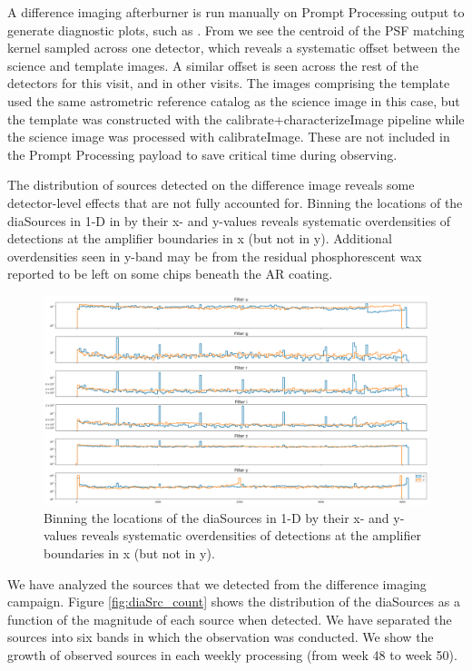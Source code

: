 A difference imaging afterburner is run manually on Prompt Processing output to generate diagnostic plots, such as .
From  we see the centroid of the PSF matching kernel sampled across one detector, which reveals a systematic offset between the science and template images.
A similar offset is seen across the rest of the detectors for this visit, and in other visits.
The images comprising the template used the same astrometric reference catalog as the science image in this case, but the template was constructed with the calibrate+characterizeImage pipeline while the science image was processed with calibrateImage.
These are not included in the Prompt Processing payload to save critical time during observing.

The distribution of sources detected on the difference image reveals some detector-level effects that are not fully accounted for.
Binning the locations of the diaSources in 1-D in  by their x- and y-values reveals systematic overdensities of detections at the amplifier boundaries in x (but not in y).
Additional overdensities seen in y-band may be from the residual phosphorescent wax reported to be left on some chips beneath the AR coating.

\begin{figure}
\includegraphics[width=\textwidth]{dia/figures/diaSource_distribution.png}
\caption{Binning the locations of the diaSources in 1-D by their x- and y-values reveals systematic overdensities of detections at the amplifier boundaries in x (but not in y). \label{fig:diaSource-distribution}}
\end{figure}

We have analyzed the sources that we detected from the difference imaging campaign. Figure \ref{fig:diaSrc_count} shows the distribution of the diaSources as a function of the magnitude of each source when detected. We have separated the sources into six bands in which the observation was conducted. We show the growth of observed sources in each weekly processing (from week 48 to week 50).

